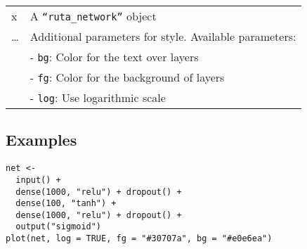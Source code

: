 \begin{longtable}[c]{@{}>{\small}p{3cm}>{\raggedright}p{12.5cm}@{}}
\toprule
\begin{minipage}[t]{0.08\columnwidth}\raggedright\strut
x
\strut\end{minipage} &
\begin{minipage}[t]{0.73\columnwidth}\raggedright\strut
A \texttt{``ruta\_network''} object
\strut\end{minipage}\tabularnewline
\begin{minipage}[t]{0.08\columnwidth}\raggedright\strut
\ldots{}
\strut\end{minipage} &
\begin{minipage}[t]{0.73\columnwidth}\raggedright\strut
Additional parameters for style. Available parameters:
\strut\end{minipage}\tabularnewline
\begin{minipage}[t]{0.08\columnwidth}\raggedright\strut
\strut\end{minipage} &
\begin{minipage}[t]{0.73\columnwidth}\raggedright\strut
- \texttt{bg}: Color for the text over layers
\strut\end{minipage}\tabularnewline
\begin{minipage}[t]{0.08\columnwidth}\raggedright\strut
\strut\end{minipage} &
\begin{minipage}[t]{0.73\columnwidth}\raggedright\strut
- \texttt{fg}: Color for the background of layers
\strut\end{minipage}\tabularnewline
\begin{minipage}[t]{0.08\columnwidth}\raggedright\strut
\strut\end{minipage} &
\begin{minipage}[t]{0.73\columnwidth}\raggedright\strut
- \texttt{log}: Use logarithmic scale
\strut\end{minipage}\tabularnewline
\bottomrule
\end{longtable}

\hypertarget{examples}{\subsection{\texorpdfstring{\protect\hyperlink{examples}{}Examples}{Examples}}\label{examples}}

\begin{verbatim}
net <-
  input() +
  dense(1000, "relu") + dropout() +
  dense(100, "tanh") +
  dense(1000, "relu") + dropout() +
  output("sigmoid")
plot(net, log = TRUE, fg = "#30707a", bg = "#e0e6ea")
\end{verbatim}


